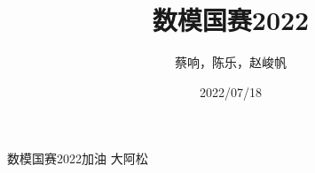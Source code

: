 \documentclass[12pt, letterpaper, twoside]{article}
\title{数模国赛2022}
\author{蔡响，陈乐，赵峻帆}
\date{2022/07/18}
\begin{document}
\maketitle

数模国赛2022加油
大阿松
\end{document}

